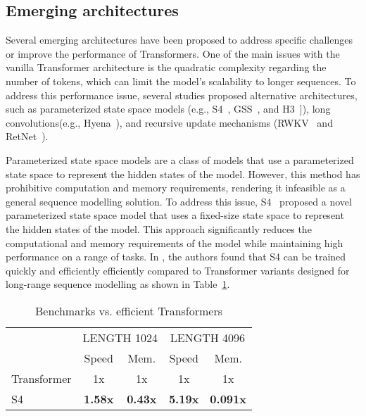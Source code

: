 \subsection{Emerging architectures}
\label{subsec:emerging-architectures}

Several emerging architectures have been proposed to address specific challenges or improve the performance of Transformers.
One of the main issues with the vanilla Transformer architecture is the quadratic complexity regarding the number of tokens, which can limit the model's scalability to longer sequences.
To address this performance issue, several studies proposed alternative architectures, such as parameterized state space models (e.g., S4~\cite{gu2022efficiently}, GSS~\cite{mehta2022long}, and H3~\cite{dao2022hungry}]), long convolutions(e.g., Hyena~\cite{poli2023hyena}), and recursive update mechanisms (RWKV~\cite{peng2023rwkv} and RetNet~\cite{sun2023retentive}).

Parameterized state space models are a class of models that use a parameterized state space to represent the hidden states of the model.
However, this method has prohibitive computation and memory requirements, rendering it infeasible as a general sequence modelling solution.
To address this issue, S4~\cite{gu2022efficiently} proposed a novel parameterized state space model that uses a fixed-size state space to represent the hidden states of the model.
This approach significantly reduces the computational and memory requirements of the model while maintaining high performance on a range of tasks.
In \textcite{gu2022efficiently}, the authors found that S4 can be trained quickly and efficiently efficiently compared to Transformer variants designed for long-range sequence modelling as shown in Table~\ref{tab:ssm_efficiency}.

\begin{table}[htbp]
	\centering
	\begin{tabularx}{0.6\textwidth}{Xcccc}
		\toprule
		            & \multicolumn{2}{c}{LENGTH 1024} & \multicolumn{2}{c}{LENGTH 4096}                                    \\
		\cmidrule(lr){2-3} \cmidrule(lr){4-5}
		            & Speed                           & Mem.                            & Speed          & Mem.            \\
		\midrule
		Transformer & 1x                              & 1x                              & 1x             & 1x              \\
		S4          & \textbf{1.58x}                  & \textbf{0.43x}                  & \textbf{5.19x} & \textbf{0.091x} \\
		\bottomrule
	\end{tabularx}
	\caption{Benchmarks vs. efficient Transformers}
	\label{tab:ssm_efficiency}
\end{table}

